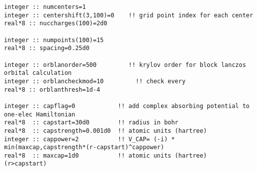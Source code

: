 \begin{verbatim}
integer :: numcenters=1
integer :: centershift(3,100)=0    !! grid point index for each center
real*8 :: nuccharges(100)=2d0

integer :: numpoints(100)=15
real*8 :: spacing=0.25d0

integer :: orblanorder=500         !! krylov order for block lanczos orbital calculation
integer :: orblancheckmod=10         !! check every
real*8 :: orblanthresh=1d-4

integer :: capflag=0            !! add complex absorbing potential to one-elec Hamiltonian
real*8  :: capstart=30d0        !! radius in bohr
real*8  :: capstrength=0.001d0  !! atomic units (hartree)
integer :: cappower=2           !! V_CAP= (-i) * min(maxcap,capstrength*(r-capstart)^cappower)
real*8  :: maxcap=1d0           !! atomic units (hartree)                     (r>capstart)
\end{verbatim}

